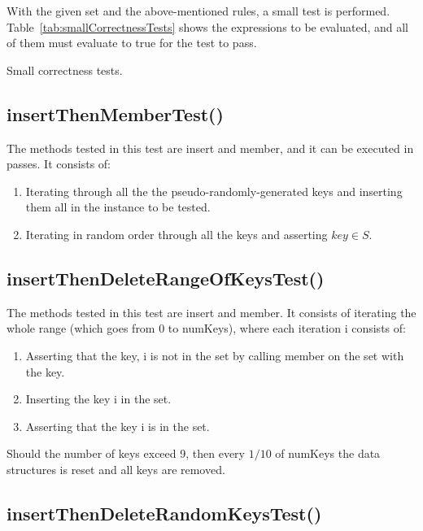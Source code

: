 With the given set and the above-mentioned rules, a small test is performed. Table~\ref{tab:smallCorrectnessTests} shows the expressions to be evaluated, and all of them must evaluate to {\ttfamily true} for the test to pass.

\begin{table}[H]
\centering

\caption[Small correctness tests]{Small correctness tests.}
\label{tab:smallCorrectnessTests}
\end{table}


\subsection{{\ttfamily insertThenMemberTest()}}

The methods tested in this test are {\ttfamily insert} and {\ttfamily member}, and it can be executed in passes. It consists of:
\begin{enumerate}
    \item
    Iterating through all the the pseudo-randomly-generated keys and inserting them all in the instance to be tested.
    \item
    Iterating in random order through all the keys and asserting $key \in S$.
\end{enumerate}

\subsection{{\ttfamily insertThenDeleteRangeOfKeysTest()}}

The methods tested in this test are {\ttfamily insert} and {\ttfamily member}. It consists of iterating the whole range (which goes from $0$ to {\ttfamily numKeys}), where each iteration {\ttfamily i} consists of:
\begin{enumerate}
    \item
    Asserting that the key, {\ttfamily i} is not in the set by calling {\ttfamily member} on the set with the key.
    \item
    Inserting the key {\ttfamily i} in the set.
    \item
    Asserting that the key {\ttfamily i} is in the set.
\end{enumerate}
Should the number of keys exceed 9, then every $1/10$ of {\ttfamily numKeys} the data structures is reset and all keys are removed.

\subsection{{\ttfamily insertThenDeleteRandomKeysTest()}}

